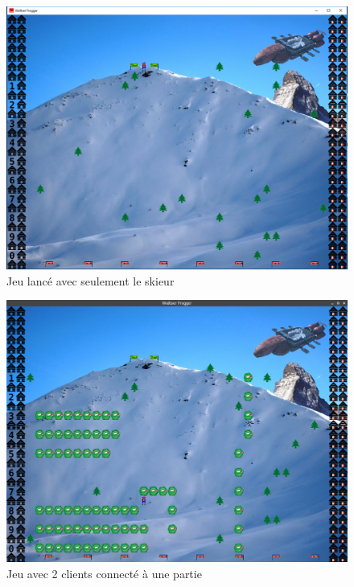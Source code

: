 \documentclass[a4paper,12pt]{article}
\begin{document}
	\begin{figure}[ht]
		\centering
		\includegraphics[width=\textwidth]{../Screenshots/jeu_skier.PNG}
		\caption{Jeu lancé avec seulement le skieur}
		\label{fig:jeuSkier}
	\end{figure}
	
	\begin{figure}[ht]
		\centering
		\includegraphics[width=\textwidth]{../Screenshots/jeu.png}
		\caption{Jeu avec 2 clients connecté à une partie}
		\label{fig:jeu}
	\end{figure}
		
	
\end{document}
